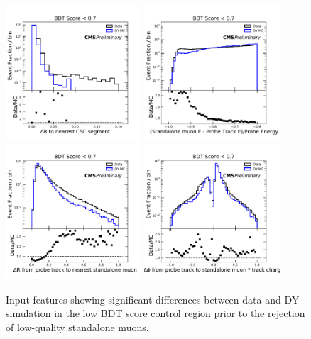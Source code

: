 \begin{figure}[htbp]
	\centering
	\includegraphics[width=0.45\textwidth]{figures/badPartialRegioncscDR.pdf}
	\hspace{0.01\textwidth}
	\includegraphics[width=0.45\textwidth]{figures/badPartialRegionstandaloneDEoverE.pdf}
	\vspace{0.01\textwidth}
	\includegraphics[width=0.45\textwidth]{figures/badPartialRegionstaDR.pdf}
	\hspace{0.01\textwidth}
	\includegraphics[width=0.45\textwidth]{figures/badPartialRegionstaPhi.pdf} 
        \caption[Low-Score Event Validation Before Correction]{Input features showing significant differences between data and DY simulation in the low BDT score control region prior to the rejection of low-quality standalone muons.}
	\label{fig:lowScoreVariableMismatch}
\end{figure}

